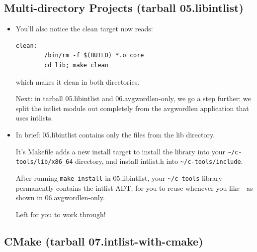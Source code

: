 \documentclass[handout]{beamer}
\begin{document}
\subsection{Multi-directory Projects (tarball 05.libintlist)}

\begin{frame}[fragile]
\begin{itemize}
\item
You'll also notice the \alert{clean} target now reads:
\begin{verbatim}
clean:
        /bin/rm -f $(BUILD) *.o core
        cd lib; make clean
\end{verbatim}
which makes it clean in both directories.

\pitem
Next: in tarball \alert{05.libintlist} and \alert{06.avgwordlen-only},
we go a step further:
we split the intlist module out completely from the
avgwordlen application that uses intlists.

\item
In brief: \alert{05.libintlist} contains only the files from
the \alert{lib} directory.

\pitem
It's Makefile adds a new \alert{install} target to install the library into
your \verb+~/c-tools/lib/x86_64+ directory,
and install intlist.h into \verb+~/c-tools/include+.

\pitem
After running \verb+make install+ in \alert{05.libintlist}, your
\verb+~/c-tools+ library permanently contains the intlist ADT, for you to
reuse whenever you like - as shown in \alert{06.avgwordlen-only}.

\pitem
Left for you to work through!

\end{itemize}
\end{frame}

\subsection{CMake (tarball 07.intlist-with-cmake)}
\end{document}
